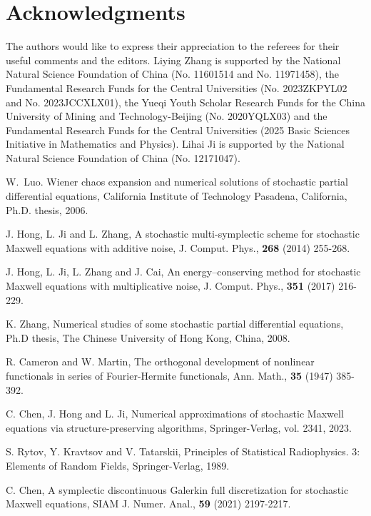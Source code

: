 \documentclass[preprint,12pt]{article}
\numberwithin{figure}{section}
\numberwithin{table}{section}
\numberwithin{equation}{section}
\begin{document}
\section*{Acknowledgments}
The authors would like to express their appreciation to the referees for their useful comments and the editors. Liying Zhang is supported by the National Natural Science Foundation of China (No. 11601514 and No. 11971458), the Fundamental Research Funds for the Central Universities (No. 2023ZKPYL02 and No. 2023JCCXLX01), the Yueqi Youth Scholar Research Funds for the China University of Mining and Technology-Beijing (No. 2020YQLX03) and the Fundamental Research Funds for the Central Universities (2025 Basic Sciences Initiative in Mathematics and Physics). Lihai Ji is supported by the National Natural Science Foundation of China (No. 12171047).
%
\begin{thebibliography}{}
  W.~Luo. Wiener chaos expansion and numerical solutions of stochastic partial differential equations, California Institute of Technology Pasadena, California, Ph.D. thesis, 2006.

J. Hong, L. Ji and L. Zhang, A stochastic multi-symplectic scheme for stochastic Maxwell equations with additive noise, J. Comput. Phys., \textbf{268} (2014) 255-268.

J. Hong, L. Ji, L. Zhang and J. Cai, An energy–conserving method for stochastic Maxwell equations with multiplicative noise, J. Comput. Phys., \textbf{351} (2017) 216-229.

K. Zhang, Numerical studies of some stochastic partial differential equations, Ph.D thesis, The Chinese University of Hong Kong, China, 2008.

R. Cameron and W. Martin, The orthogonal development of nonlinear functionals in series of Fourier-Hermite functionals, Ann. Math., \textbf{35} (1947) 385-392.

 C. Chen, J. Hong and L. Ji, Numerical approximations
 of stochastic Maxwell equations via structure-preserving algorithms, Springer-Verlag, vol. 2341, 2023.

S. Rytov, Y. Kravtsov and V. Tatarskii, Principles of Statistical Radiophysics. 3: Elements of Random Fields, Springer-Verlag, 1989.

C. Chen, A symplectic discontinuous Galerkin full discretization for stochastic Maxwell equations, SIAM J. Numer. Anal., \textbf{59} (2021) 2197-2217.


\end{thebibliography}
\end{document}
